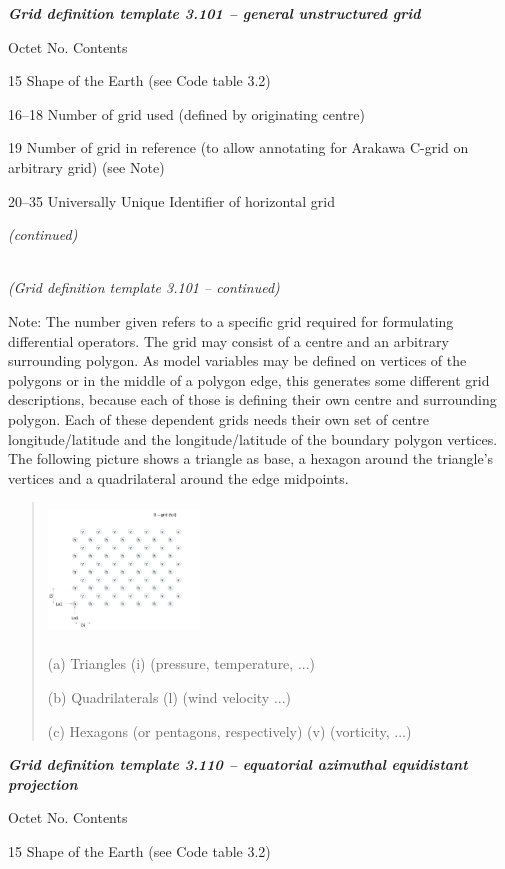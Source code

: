 \emph{\textbf{Grid definition template 3.101 -- general unstructured grid}}

Octet No. Contents

15 Shape of the Earth (see Code table 3.2)

16--18 Number of grid used (defined by originating centre)

19 Number of grid in reference (to allow annotating for Arakawa C-grid on arbitrary grid) (see Note)

20--35 Universally Unique Identifier of horizontal grid

\emph{(continued)}

\emph{\\
(Grid definition template 3.101 -- continued)}

Note: The number given refers to a specific grid required for formulating differential operators. The grid may consist of a centre and an arbitrary surrounding polygon. As model variables may be defined on vertices of the polygons or in the middle of a polygon edge, this generates some different grid descriptions, because each of those is defining their own centre and surrounding polygon. Each of these dependent grids needs their own set of centre longitude/latitude and the longitude/latitude of the boundary polygon vertices. The following picture shows a triangle as base, a hexagon around the triangle's vertices and a quadrilateral around the edge midpoints.

\begin{quote}
\includegraphics[width=1.58819in,height=1.39028in]{../tex/extracted-media/media/image1.png}

(a) Triangles (i) (pressure, temperature, ...)

(b) Quadrilaterals (l) (wind velocity ...)

(c) Hexagons (or pentagons, respectively) (v) (vorticity, ...)
\end{quote}

\emph{\textbf{Grid definition template 3.110 -- equatorial azimuthal equidistant projection}}

Octet No. Contents

15 Shape of the Earth (see Code table 3.2)

